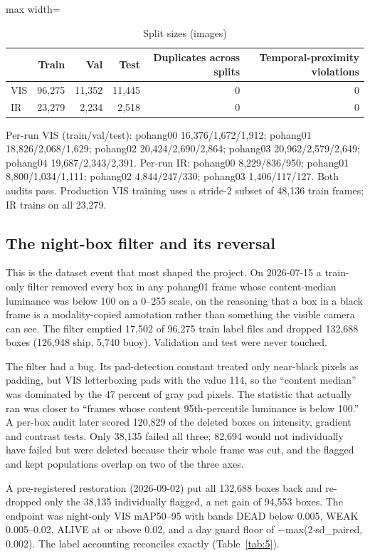 \documentclass[journal,onecolumn]{IEEEtran}
\begin{document}
\begin{table}[htbp]
\centering
\footnotesize
\caption{Split sizes (images)}
\label{tab:4}
\begin{adjustbox}{max width=\linewidth}
\begin{tabular}{lrrrrr}
\toprule
 & Train & Val & Test & Duplicates across splits & Temporal-proximity violations \\
\midrule
VIS & 96,275 & 11,352 & 11,445 & 0 & 0 \\
IR & 23,279 & 2,234 & 2,518 & 0 & 0 \\
\bottomrule
\end{tabular}
\end{adjustbox}
\end{table}
Per-run VIS (train/val/test): pohang00 16,376/1,672/1,912; pohang01 18,826/2,068/1,629; pohang02 20,424/2,690/2,864; pohang03 20,962/2,579/2,649; pohang04 19,687/2,343/2,391. Per-run IR: pohang00 8,229/836/950; pohang01 8,800/1,034/1,111; pohang02 4,844/247/330; pohang03 1,406/117/127. Both audits pass. Production VIS training uses a stride-2 subset of 48,136 train frames; IR trains on all 23,279.

\subsection{The night-box filter and its reversal}\label{app:A.4}
This is the dataset event that most shaped the project. On 2026-07-15 a train-only filter removed every box in any pohang01 frame whose content-median luminance was below 100 on a 0--255 scale, on the reasoning that a box in a black frame is a modality-copied annotation rather than something the visible camera can see. The filter emptied 17,502 of 96,275 train label files and dropped 132,688 boxes (126,948 ship, 5,740 buoy). Validation and test were never touched.

The filter had a bug. Its pad-detection constant treated only near-black pixels as padding, but VIS letterboxing pads with the value 114, so the ``content median'' was dominated by the 47 percent of gray pad pixels. The statistic that actually ran was closer to ``frames whose content 95th-percentile luminance is below 100.'' A per-box audit later scored 120,829 of the deleted boxes on intensity, gradient and contrast tests. Only 38,135 failed all three; 82,694 would not individually have failed but were deleted because their whole frame was cut, and the flagged and kept populations overlap on two of the three axes.

A pre-registered restoration (2026-09-02) put all 132,688 boxes back and re-dropped only the 38,135 individually flagged, a net gain of 94,553 boxes. The endpoint was night-only VIS mAP50--95 with bands DEAD below 0.005, WEAK 0.005--0.02, ALIVE at or above 0.02, and a day guard floor of $-$max(2$\cdot$sd\_paired, 0.002). The label accounting reconciles exactly (Table~\ref{tab:5}).
\end{document}
